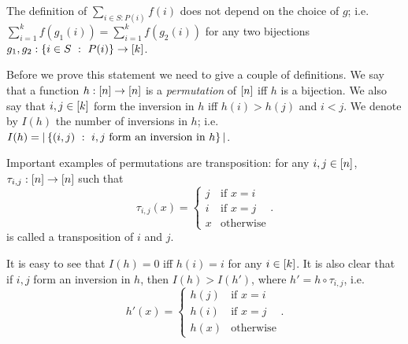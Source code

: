 \begin{theorem}
\label{theorem:sum-correctness}
    The definition of $\sum_{i \in S : P(i)} f(i)$ does not depend on the choice
    of $g$;
    i.e. $\sum_{i = 1}^k f(g_1(i)) = \sum_{i = 1}^k f(g_2(i))$
    for any two bijections $g_1, g_2 : \set[P(i)]{i \in S} \to \range{k}$.
\end{theorem}
Before we prove this statement we need to give a couple of definitions.
We say that a function $h : {[{n}]} \to {[{n}]}$ is a \emph{permutation} of
${[{n}]}$ iff $h$ is a bijection. We also say that
$i, j \in {[{k}]}$ form the inversion in $h$ iff $h(i) > h(j)$ and $i < j$.
We denote by $I(h)$ the number of inversions in $h$; i.e. $I(h) =
|\set[i, j \text{ form an inversion in } h]{(i, j)}|$.

Important examples of permutations are transposition: for any
$i, j \in {[{n}]}$, $\tau_{i, j} : {[{n}]} \to {[{n}]}$ such that
\[
    \tau_{i, j}(x) =
    \begin{cases}
        j & \text{if } x = i \\
        i & \text{if } x = j \\
        x & \text{otherwise}
    \end{cases}.
\]
is called a transposition of $i$ and $j$.

It is easy to see that $I(h) = 0$ iff $h(i) = i$ for any $i \in {[{k}]}$.
It is also clear that if $i, j$ form an inversion in $h$, then $I(h) > I(h')$,
where $h' = h \circ \tau_{i, j}$, i.e.
\[
    h'(x) =
    \begin{cases}
        h(j) & \text{if } x = i \\
        h(i) & \text{if } x = j \\
        h(x) & \text{otherwise}
    \end{cases}.
\]


